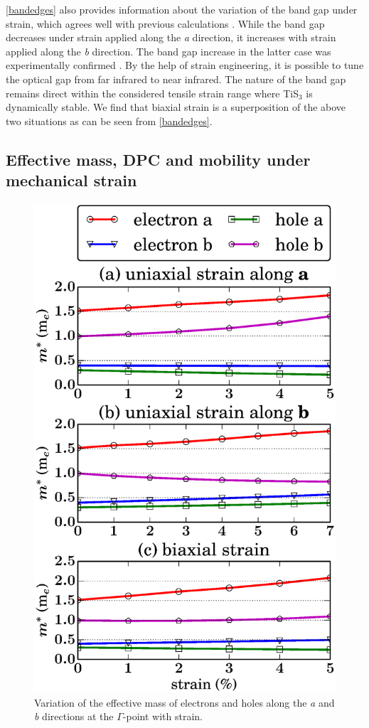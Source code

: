 \autoref{bandedges} also provides information about the variation of the band gap under strain, which agrees well with previous calculations \cite{Biele2015,Li2015}. While the band gap decreases under strain applied along the \textit{a} direction, it increases with strain applied  along the \textit{b} direction. The band gap increase in the latter case was experimentally confirmed \cite{Biele2015}.  By the help of  strain engineering, it is possible to tune the optical gap from far infrared to near infrared. The nature of the band gap remains direct within the considered tensile strain range where TiS$_3$ is dynamically stable. We find that  biaxial strain is a superposition of the above two situations as can be seen from \autoref{bandedges}. 

\subsection{Effective mass, DPC and mobility under  mechanical strain}

\begin{figure}[htb]
\centering
\includegraphics[width=0.6\linewidth]{Mob_emass.eps}
\caption{Variation of the effective mass of electrons and holes along the \textit{a} and \textit{b} directions at the $\Gamma$-point with strain. \label{emass}}	
\end{figure} 

